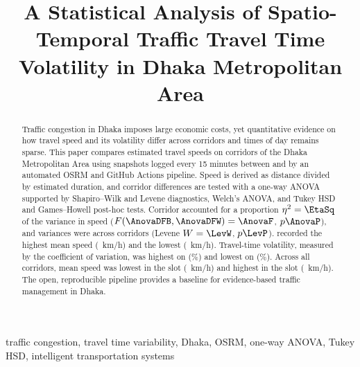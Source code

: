 \documentclass[conference]{IEEEtran}
\begin{document}
\title{A Statistical Analysis of Spatio-Temporal Traffic Travel Time Volatility in Dhaka Metropolitan Area}

\author{
}

\maketitle

\begin{abstract}
Traffic congestion in Dhaka imposes large economic costs, yet quantitative evidence on how travel speed and its volatility differ across corridors and times of day remains sparse. This paper compares estimated travel speeds on \NCorr{} corridors of the Dhaka Metropolitan Area using \NObs{} snapshots logged every 15 minutes between \DateStart{} and \DateEnd{} by an automated OSRM and GitHub Actions pipeline. Speed is derived as distance divided by estimated duration, and corridor differences are tested with a one-way ANOVA supported by Shapiro--Wilk and Levene diagnostics, Welch's ANOVA, and Tukey HSD and Games--Howell post-hoc tests. Corridor accounted for a proportion $\eta^2 = \EtaSq$ of the variance in speed ($F(\AnovaDFB,\AnovaDFW) = \AnovaF$, $p \AnovaP$), and variances were \LevVerdict{} across corridors (Levene $W = \LevW$, $p \LevP$). \FastestCorr{} recorded the highest mean speed (\FastestMean~km/h) and \SlowestCorr{} the lowest (\SlowestMean~km/h). Travel-time volatility, measured by the coefficient of variation, was highest on \MostVolCorr{} (\MostVolCV\%) and lowest on \LeastVolCorr{} (\LeastVolCV\%). Across all corridors, mean speed was lowest in the \SlowSlot{} slot (\SlowSlotMean~km/h) and highest in the \FastSlot{} slot (\FastSlotMean~km/h). The open, reproducible pipeline provides a baseline for evidence-based traffic management in Dhaka.
\end{abstract}

\begin{IEEEkeywords}
traffic congestion, travel time variability, Dhaka, OSRM, one-way ANOVA, Tukey HSD, intelligent transportation systems
\end{IEEEkeywords}

\end{document}
